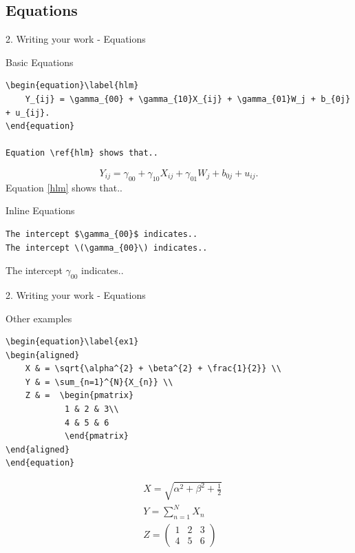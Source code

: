 \documentclass[13pt]{beamer}
\newcommand{\itemA}{\item[\textcolor{black}{\textbullet}]}
\begin{document}
\subsection{Equations}
\begin{frame}[fragile]{2. Writing your work - Equations}
\begin{fullpageitemize}
\itemA Basic Equations \hfill \break
{\scriptsize
\begin{verbatim}
\begin{equation}\label{hlm}
    Y_{ij} = \gamma_{00} + \gamma_{10}X_{ij} + \gamma_{01}W_j + b_{0j} + u_{ij}.
\end{equation}

Equation \ref{hlm} shows that..
\end{verbatim}
}
{\small
\begin{equation}\label{hlm}
    Y_{ij} = \gamma_{00} + \gamma_{10}X_{ij} + \gamma_{01}W_j + b_{0j} + u_{ij}.
\end{equation}
Equation \ref{hlm} shows that..}

\itemA Inline Equations \hfill \break
{\footnotesize
\begin{verbatim}
The intercept $\gamma_{00}$ indicates..
The intercept \(\gamma_{00}\) indicates..
\end{verbatim}}
{\small The intercept \(\gamma_{00}\) indicates..}
\end{fullpageitemize}
\end{frame}

\begin{frame}[fragile]{2. Writing your work - Equations}
\begin{fullpageitemize}
\itemA Other examples \hfill \break
{\scriptsize
\begin{verbatim}
\begin{equation}\label{ex1}
\begin{aligned}
    X & = \sqrt{\alpha^{2} + \beta^{2} + \frac{1}{2}} \\
    Y & = \sum_{n=1}^{N}{X_{n}} \\
    Z & =  \begin{pmatrix}
            1 & 2 & 3\\
            4 & 5 & 6 
            \end{pmatrix}
\end{aligned}
\end{equation}
\end{verbatim}
}
{\footnotesize
\begin{equation}\label{ex1}
\begin{aligned}
& X  = \sqrt{\alpha^{2} + \beta^{2} + \frac{1}{2}} \\
& Y  = \sum_{n=1}^{N}{X_{n}} \\
& Z  = 
\begin{pmatrix}
1 & 2 & 3\\
4 & 5 & 6 
\end{pmatrix}
\end{aligned}
\end{equation}
}
\end{fullpageitemize}
\end{frame}
\end{document}
